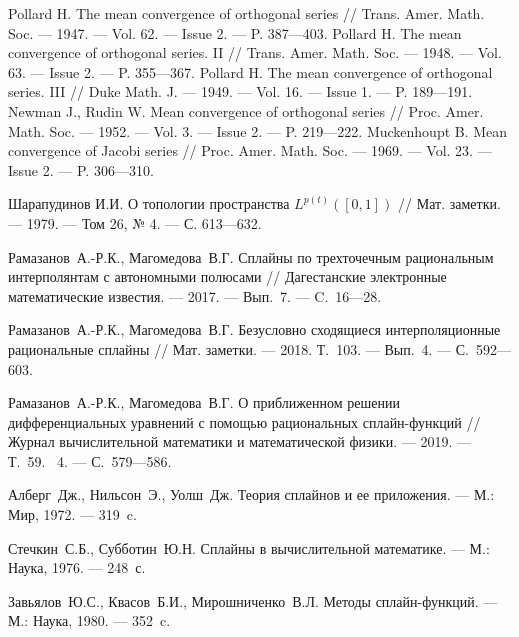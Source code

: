 \begin{thebibliography}{111}
 Pollard H. The mean convergence of orthogonal series // Trans. Amer. Math. Soc.
--- 1947. --- Vol. 62. --- Issue 2. --- P. 387---403.
 Pollard H. The mean convergence of orthogonal series. II // Trans. Amer. Math. Soc.
--- 1948. --- Vol. 63. --- Issue 2. --- P. 355---367.
 Pollard H. The mean convergence of orthogonal series. III // Duke Math. J. --- 1949.
--- Vol. 16. --- Issue 1. --- P. 189---191.
 Newman J., Rudin W. Mean convergence of orthogonal series // Proc. Amer. Math.
Soc. --- 1952. --- Vol. 3. --- Issue 2. --- P. 219---222.
Muckenhoupt B. Mean convergence of Jacobi series // Proc. Amer. Math. Soc. --- 1969.
--- Vol. 23. --- Issue 2. --- P. 306---310.

 Шарапудинов И.И. О топологии пространства $L^{p(t)}([0,1])$ // Мат. заметки. --- 1979. --- Том 26, № 4. --- С. 613---632.





 
 Рамазанов~А.-Р.К., Магомедова~В.Г. Сплайны по трехточечным 
рациональным интерполянтам с автономными полюсами // Дагестанские электронные
 математические известия. --- 2017. --- Вып.~7. --- C.~16---28.

 Рамазанов~А.-Р.К., Магомедова~В.Г. Безусловно сходящиеся интерполяционные рациональные сплайны // Мат. заметки. --- 2018. Т.~103. --- Вып.~4. --- С.~592---603.

 Рамазанов~А.-Р.К., Магомедова~В.Г. О приближенном решении дифференциальных 
уравнений с помощью рациональных сплайн-функций // Журнал вычислительной математики и математической физики. --- 2019. --- Т.~59. \No~4. --- С.~579---586.

  Алберг~Дж., Нильсон~Э., Уолш~Дж. Теория сплайнов и ее приложения. --- М.: Мир, 1972. --- 319~c.

  Стечкин~С.Б., Субботин~Ю.Н. Сплайны в вычислительной математике.
 --- М.: Наука, 1976. --- 248~с.

  Завьялов~Ю.С., Квасов~Б.И., Мирошниченко~В.Л. Методы сплайн-функций.
 --- М.: Наука, 1980. --- 352~c.


\end{thebibliography}
